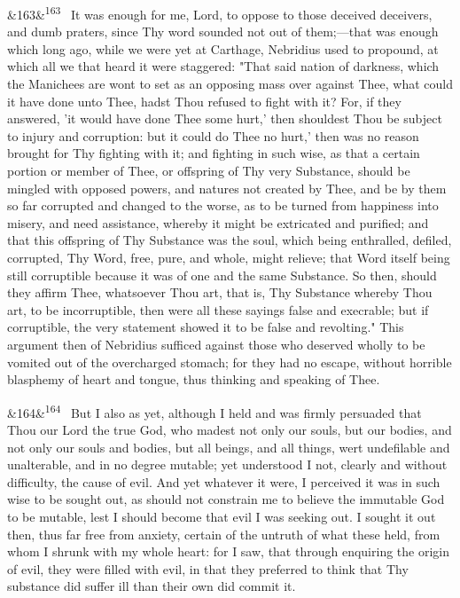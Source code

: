 \documentclass[12pt]{article}
\newcommand{\para}[1][]{\par\noindent\ifx&#1&\else\textsuperscript{\footnotesize #1}~\fi}
\begin{document}
\para[163] It was enough for me, Lord, to oppose to those deceived deceivers, and dumb praters, since Thy word sounded not out of them;---that was enough which long ago, while we were yet at Carthage, Nebridius used to propound, at which all we that heard it were staggered: "That said nation of darkness, which the Manichees are wont to set as an opposing mass over against Thee, what could it have done unto Thee, hadst Thou refused to fight with it? For, if they answered, 'it would have done Thee some hurt,' then shouldest Thou be subject to injury and corruption: but it could do Thee no hurt,' then was no reason brought for Thy fighting with it; and fighting in such wise, as that a certain portion or member of Thee, or offspring of Thy very Substance, should be mingled with opposed powers, and natures not created by Thee, and be by them so far corrupted and changed to the worse, as to be turned from happiness into misery, and need assistance, whereby it might be extricated and purified; and that this offspring of Thy Substance was the soul, which being enthralled, defiled, corrupted, Thy Word, free, pure, and whole, might relieve; that Word itself being still corruptible because it was of one and the same Substance. So then, should they affirm Thee, whatsoever Thou art, that is, Thy Substance whereby Thou art, to be incorruptible, then were all these sayings false and execrable; but if corruptible, the very statement showed it to be false and revolting." This argument then of Nebridius sufficed against those who deserved wholly to be vomited out of the overcharged stomach; for they had no escape, without horrible blasphemy of heart and tongue, thus thinking and speaking of Thee.

\para[164] But I also as yet, although I held and was firmly persuaded that Thou our Lord the true God, who madest not only our souls, but our bodies, and not only our souls and bodies, but all beings, and all things, wert undefilable and unalterable, and in no degree mutable; yet understood I not, clearly and without difficulty, the cause of evil. And yet whatever it were, I perceived it was in such wise to be sought out, as should not constrain me to believe the immutable God to be mutable, lest I should become that evil I was seeking out. I sought it out then, thus far free from anxiety, certain of the untruth of what these held, from whom I shrunk with my whole heart: for I saw, that through enquiring the origin of evil, they were filled with evil, in that they preferred to think that Thy substance did suffer ill than their own did commit it.
\end{document}
